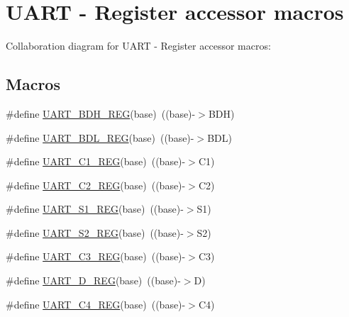 \hypertarget{group___u_a_r_t___register___accessor___macros}{}\section{U\+A\+RT -\/ Register accessor macros}
\label{group___u_a_r_t___register___accessor___macros}
Collaboration diagram for U\+A\+RT -\/ Register accessor macros\+:
\subsection*{Macros}
\begin{DoxyCompactItemize}
\item 
\#define \hyperlink{group___u_a_r_t___register___accessor___macros_ga87a103f3d6a0d05f6b0c909cfeb7a4d9}{U\+A\+R\+T\+\_\+\+B\+D\+H\+\_\+\+R\+EG}(base)~((base)-\/$>$B\+DH)
\item 
\#define \hyperlink{group___u_a_r_t___register___accessor___macros_ga76a25b51a88219d40b957fed02d5e196}{U\+A\+R\+T\+\_\+\+B\+D\+L\+\_\+\+R\+EG}(base)~((base)-\/$>$B\+DL)
\item 
\#define \hyperlink{group___u_a_r_t___register___accessor___macros_ga10f9aabe3d0f670422c5342bebc3f3e2}{U\+A\+R\+T\+\_\+\+C1\+\_\+\+R\+EG}(base)~((base)-\/$>$C1)
\item 
\#define \hyperlink{group___u_a_r_t___register___accessor___macros_ga3ef76a47d3674e17ffcbf0bfb4ac2680}{U\+A\+R\+T\+\_\+\+C2\+\_\+\+R\+EG}(base)~((base)-\/$>$C2)
\item 
\#define \hyperlink{group___u_a_r_t___register___accessor___macros_ga5ff0eec7fa7a282423d94fc39f143624}{U\+A\+R\+T\+\_\+\+S1\+\_\+\+R\+EG}(base)~((base)-\/$>$S1)
\item 
\#define \hyperlink{group___u_a_r_t___register___accessor___macros_ga0e7d1c8dce2636260ce4ca1c63d622db}{U\+A\+R\+T\+\_\+\+S2\+\_\+\+R\+EG}(base)~((base)-\/$>$S2)
\item 
\#define \hyperlink{group___u_a_r_t___register___accessor___macros_ga9a97319347f88dbd676dfa0c5b2bedae}{U\+A\+R\+T\+\_\+\+C3\+\_\+\+R\+EG}(base)~((base)-\/$>$C3)
\item 
\#define \hyperlink{group___u_a_r_t___register___accessor___macros_ga7ab320159fa5e0cf0d6526d0bd8ca27c}{U\+A\+R\+T\+\_\+\+D\+\_\+\+R\+EG}(base)~((base)-\/$>$D)
\item 
\#define \hyperlink{group___u_a_r_t___register___accessor___macros_gaa13bbde4cda116273e3a2e1bc92bfa43}{U\+A\+R\+T\+\_\+\+C4\+\_\+\+R\+EG}(base)~((base)-\/$>$C4)

\end{DoxyCompactItemize}
